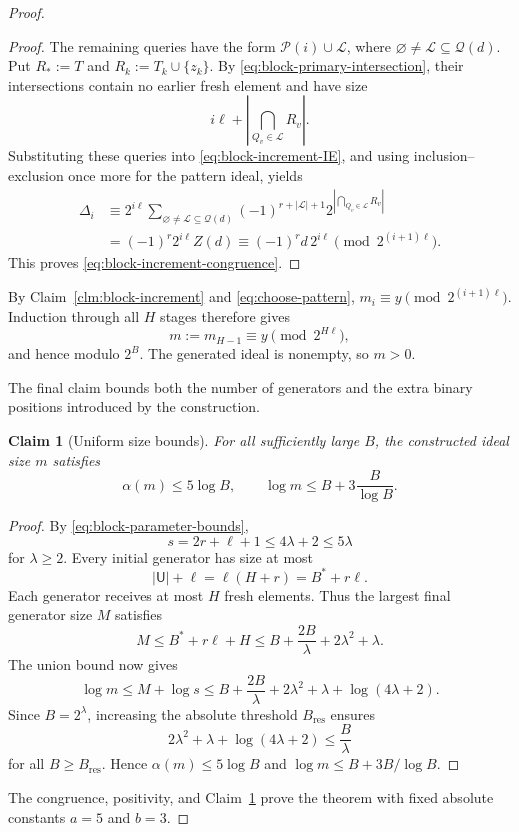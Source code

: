 \documentclass[11pt]{article}
\newtheorem{claim}[claim]{Claim}
\theoremstyle{definition}
\theoremstyle{remark}
\begin{document}
\begin{proof}
\begin{proof}
The remaining queries have the form
$\mathcal P(i)\cup\mathcal L$, where
$\varnothing\ne\mathcal L\subseteq\mathcal Q(d)$.  Put
$R_*:=T$ and $R_k:=T_k\cup\{z_k\}$.  By
\eqref{eq:block-primary-intersection}, their intersections contain no
earlier fresh element and have size
\[
  i\ell+\left|\bigcap_{Q_v\in\mathcal L}R_v\right|.
\]
Substituting these queries into \eqref{eq:block-increment-IE}, and using
inclusion--exclusion once more for the pattern ideal, yields
\begin{align*}
  \Delta_i
  &\equiv
    2^{i\ell}
    \sum_{\varnothing\ne\mathcal L\subseteq\mathcal Q(d)}
      (-1)^{r+|\mathcal L|+1}
      2^{|\bigcap_{Q_v\in\mathcal L}R_v|} \\
  &=(-1)^r2^{i\ell}Z(d)
   \equiv(-1)^r d\,2^{i\ell}
     \pmod{2^{(i+1)\ell}}.
\end{align*}
This proves \eqref{eq:block-increment-congruence}.
\end{proof}

By Claim~\ref{clm:block-increment} and \eqref{eq:choose-pattern},
$m_i\equiv y\pmod{2^{(i+1)\ell}}$.  Induction through all $H$ stages
therefore gives
\[
  m:=m_{H-1}\equiv y\pmod{2^{H\ell}},
\]
and hence modulo $2^B$.  The generated ideal is nonempty, so $m>0$.

The final claim bounds both the number of generators and the extra
binary positions introduced by the construction.

\begin{claim}[Uniform size bounds]\label{clm:block-final-bounds}
For all sufficiently large $B$, the constructed ideal size $m$ satisfies
\[
  \alpha(m)\le5\log B,
  \qquad
  \log m\le B+3\frac{B}{\log B}.
\]
\end{claim}

\begin{proof}
By \eqref{eq:block-parameter-bounds},
\[
  s=2r+\ell+1\le4\lambda+2\le5\lambda
\]
for $\lambda\ge2$.  Every initial generator has size at most
\[
  |\mathsf U|+\ell=\ell(H+r)=B^*+r\ell.
\]
Each generator receives at most $H$ fresh elements.  Thus the largest
final generator size $M$ satisfies
\[
  M\le B^*+r\ell+H
   \le B+\frac{2B}{\lambda}+2\lambda^2+\lambda.
\]
The union bound now gives
\[
  \log m\le M+\log s
  \le B+\frac{2B}{\lambda}+2\lambda^2+\lambda+\log(4\lambda+2).
\]
Since $B=2^\lambda$, increasing the absolute threshold $B_{\mathrm{res}}$ ensures
\[
  2\lambda^2+\lambda+\log(4\lambda+2)\le\frac{B}{\lambda}
\]
for all $B\ge B_{\mathrm{res}}$.  Hence $\alpha(m)\le5\log B$ and
$\log m\le B+3B/\log B$.
\end{proof}

The congruence, positivity, and Claim~\ref{clm:block-final-bounds} prove
the theorem with fixed absolute constants $a=5$ and $b=3$.
\end{proof}
\end{document}

